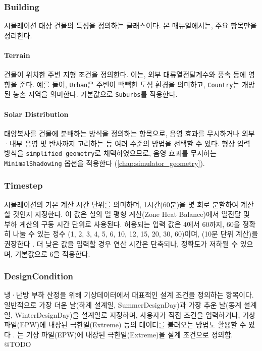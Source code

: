\subsubsection{Building} 시뮬레이션 대상 건물의 특성을 정의하는 클래스이다. 본 매뉴얼에서는, 주요 항목만을 정리한다.
\paragraph[short]{Terrain} 건물이 위치한 주변 지형 조건을 정의한다. 이는, 외부 대류열전달계수와 풍속 등에 영향을 준다. 예를 들어, \texttt{Urban}은 주변이 빽빽한 도심 환경을 의미하고, \texttt{Country}는 개방된 농촌 지역을 의미한다. \simulator\는 기본값으로 \texttt{Suburbs}를 적용한다.
\paragraph[short]{Solar Distribution} 태양복사를 건물에 분배하는 방식을 정의하는 항목으로, 음영 효과를 무시하거나 외부·내부 음영 및 반사까지 고려하는 등 여러 수준의 방법을 선택할 수 있다. 
\simulator\는 형상 입력 방식을 \texttt{simplified geometry}로 채택하였으므로, 음영 효과를 무시하는 \texttt{MinimalShadowing} 옵션을 적용한다 (\cref{chap:simulator_geometry}).

\subsubsection{Timestep} 시뮬레이션의 기본 계산 시간 단위를 의미하며, 1시간(60분)을 몇 회로 분할하여 계산할 것인지 지정한다. 이 값은 실의 열 평형 계산(Zone Heat Balance)에서 열전달 및 부하 계산의 구동 시간 단위로 사용된다. 허용되는 입력 값은 4에서 60까지, 60을 정확히 나눌 수 있는 정수 (1, 2, 3, 4, 5, 6, 10, 12, 15, 20, 30, 60)이며, \ep{}(10분 단위 계산)을 권장한다 \cite{energyplusior242}. 더 낮은 값을 입력할 경우 연산 시간은 단축되나, 정확도가 저하될 수 있으며, \simulator\는 기본값으로 6을 적용한다. 

\subsubsection{DesignCondition} 냉·난방 부하 산정을 위해 기상데이터에서 대표적인 설계 조건을 정의하는 항목이다. 일반적으로 가장 더운 날(하계 설계일, SummerDesignDay)과 가장 추운 날(동계 설계일, WinterDesignDay)을 설계일로 지정하며, 사용자가 직접 조건을 입력하거나, 기상 파일(EPW)에 내장된 극한일(Extreme) 등의 데이터를 불러오는 방법도 활용할 수 있다 \cite{energyplusior242}.
\simulator 는 기상 파일(EPW)에 내장된 극한일(Extreme)을 설계 조건으로 정의함. @TODO


